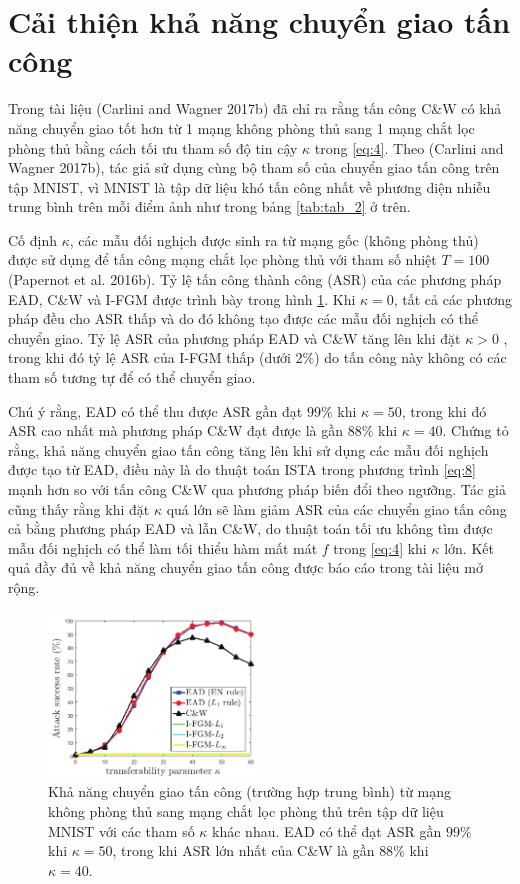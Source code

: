 \section{Cải thiện khả năng chuyển giao tấn công}
Trong tài liệu (Carlini and Wagner 2017b) đã chỉ ra rằng tấn công C\&W có khả năng chuyển giao tốt hơn  từ 1 mạng không phòng thủ sang 1 mạng chắt lọc phòng thủ bằng cách tối ưu tham số độ tin cậy $\kappa$ trong \ref{eq:4}. Theo (Carlini and Wagner 2017b), tác giả sử dụng cùng bộ tham số của chuyển giao tấn công trên tập MNIST, vì MNIST là tập dữ liệu khó tấn công nhất về phương diện nhiễu trung bình trên mỗi điểm ảnh như trong bảng \ref{tab:tab_2} ở trên.

Cố định $\kappa$, các mẫu đối nghịch được sinh ra từ mạng gốc (không phòng thủ) được sử dụng để tấn công mạng chắt lọc phòng thủ với tham số nhiệt $T = 100$ (Papernot et al. 2016b). Tỷ lệ tấn công thành công (ASR) của các phương pháp EAD, C\&W và I-FGM được trình bày trong hình \ref{fig:fg_04}. Khi $\kappa = 0$, tất cả các phương pháp đều cho ASR thấp và do đó không tạo được các mẫu đối nghịch có thể chuyển giao. Tỷ lệ ASR của phương pháp EAD và C\&W tăng lên khi đặt $\kappa > 0$ , trong khi đó tỷ lệ ASR của I-FGM thấp (dưới $2\%$) do tấn công này không có các tham số tương tự để có thể chuyển giao.

Chú ý rằng, EAD có thể thu được ASR gần đạt $99\%$ khi $\kappa = 50$, trong khi đó ASR cao nhất mà phương pháp C\&W đạt được là gần $88\%$ khi $\kappa = 40$. Chứng tỏ rằng, khả năng chuyển giao tấn công tăng lên khi sử dụng các mẫu đối nghịch được tạo từ EAD, điều này là do thuật toán ISTA trong phương trình \ref{eq:8} mạnh hơn so với tấn công C\&W qua phương pháp biến đổi theo ngưỡng. Tác giả cũng thấy rằng khi đặt $\kappa$ quá lớn sẽ làm giảm ASR của các chuyển giao tấn công cả bằng phương pháp EAD và lẫn C\&W, do thuật toán tối ưu không tìm được mẫu đối nghịch có thể làm tối thiểu hàm mất mát $f$ trong \ref{eq:4} khi $\kappa$ lớn. Kết quả đầy đủ về khả năng chuyển giao tấn công được báo cáo trong tài liệu mở rộng.

\begin{figure}[H] %
    \centering %
    \includegraphics[width=0.5\textwidth]{assets/fig_04.png} 
    \caption{Khả năng chuyển giao tấn công (trường hợp trung bình) từ mạng không phòng thủ sang mạng chắt lọc phòng thủ  trên tập dữ liệu MNIST với các tham số $\kappa$ khác nhau. EAD có thể đạt ASR gần $99\%$ khi $\kappa = 50$, trong khi ASR lớn nhất của C\&W là gần $88\%$ khi $\kappa=40$.} %
    \label{fig:fg_04}
\end{figure}